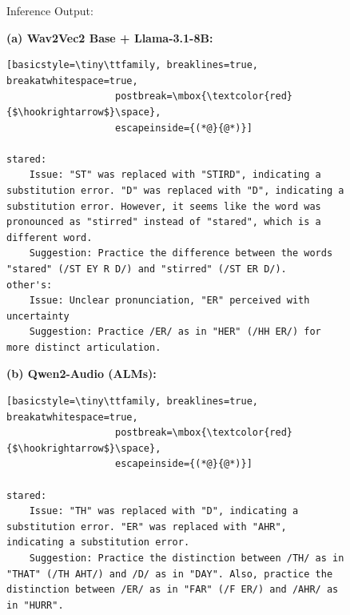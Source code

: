 \documentclass[11pt]{article}
\begin{document}
\begin{figure}[ht]
\begin{AIBox_2}{Inference Output:}

\begin{minipage}[t]{\textwidth}
{\bf (a) Wav2Vec2 Base + Llama-3.1-8B:} \scriptsize
\begin{lstlisting}[basicstyle=\tiny\ttfamily, breaklines=true, breakatwhitespace=true,
                   postbreak=\mbox{\textcolor{red}{$\hookrightarrow$}\space},
                   escapeinside={(*@}{@*)}]

stared: 
    Issue: "ST" was replaced with "STIRD", indicating a substitution error. "D" was replaced with "D", indicating a substitution error. However, it seems like the word was pronounced as "stirred" instead of "stared", which is a different word. 
    Suggestion: Practice the difference between the words "stared" (/ST EY R D/) and "stirred" (/ST ER D/).
other's: 
    Issue: Unclear pronunciation, "ER" perceived with uncertainty 
    Suggestion: Practice /ER/ as in "HER" (/HH ER/) for more distinct articulation.
\end{lstlisting}
\end{minipage}

\tcbline

\begin{minipage}[t]{\textwidth}
{\bf (b) Qwen2-Audio (ALMs):} \scriptsize
\begin{lstlisting}[basicstyle=\tiny\ttfamily, breaklines=true, breakatwhitespace=true,
                   postbreak=\mbox{\textcolor{red}{$\hookrightarrow$}\space},
                   escapeinside={(*@}{@*)}]

stared: 
    Issue: "TH" was replaced with "D", indicating a substitution error. "ER" was replaced with "AHR", indicating a substitution error. 
    Suggestion: Practice the distinction between /TH/ as in "THAT" (/TH AHT/) and /D/ as in "DAY". Also, practice the distinction between /ER/ as in "FAR" (/F ER/) and /AHR/ as in "HURR".
\end{lstlisting}
\end{minipage}

\tcbline


\end{AIBox_2}
\end{figure}
\end{document}
